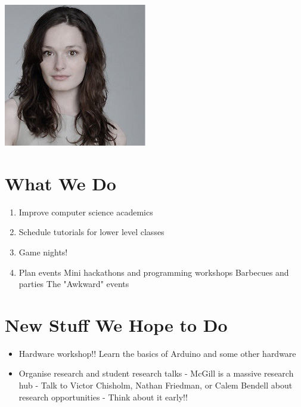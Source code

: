 \begin{center}
	 	\includegraphics[width=.35\textheight]{gfx/genevievethumb.jpg}
	\end{center}


\clearpage

\section{What We Do}

\begin{enumerate}
	\item Improve computer science academics
	\item Schedule tutorials for lower level classes
	\item Game nights!
	\item Plan events
		\subitem Mini hackathons and programming workshops
		\subitem Barbecues and parties
		\subitem The "Awkward" events
\end{enumerate}

\clearpage

\section{New Stuff We Hope to Do}

\begin{itemize}
	\item Hardware workshop!!  Learn the basics of Arduino and some other hardware
	\item Organise research and student research talks
			\subitem - McGill is a massive research hub
			\subitem - Talk to Victor Chisholm, Nathan Friedman, \newline \space \hspace*{2.5em} or Calem Bendell about research opportunities
			\subitem - Think about it early!!
\end{itemize}

\clearpage

